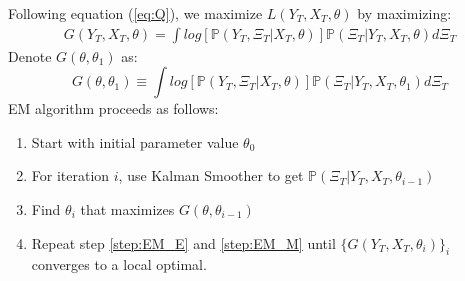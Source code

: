 \documentclass[12pt]{article}
\newenvironment{boenumerate}
    {\begin{enumerate}\renewcommand\labelenumi{\textbf\theenumi}}
    {\end{enumerate}}
\numberwithin{equation}{section}
\begin{document}
Following equation (\ref{eq:Q}), we maximize $L(Y_T,X_T,\theta)$ by maximizing: 
\begin{align}
    G(Y_T,X_T,\theta) = \int log[\mathbb{P}(Y_T,\Xi_T|X_T,\theta)]\mathbb{P}(\Xi_T|Y_T,X_T,\theta)d\Xi_T \label{eq:G}
\end{align}
Denote $G(\theta,\theta_1)$ as: 
\[
    G(\theta,\theta_1) \equiv \int log[\mathbb{P}(Y_T,\Xi_T|X_T,\theta)]\mathbb{P}(\Xi_T|Y_T,X_T,\theta_1)d\Xi_T
\]
EM algorithm proceeds as follows:
\begin{boenumerate}
    \item Start with initial parameter value $\theta_0$
    \item \label{step:EM_E} For iteration $i$, use Kalman Smoother to get $\mathbb{P}(\Xi_T|Y_T,X_T,\theta_{i-1})$
    \item \label{step:EM_M} Find $\theta_{i}$ that maximizes $G(\theta,\theta_{i-1})$    
    \item Repeat step \ref{step:EM_E} and \ref{step:EM_M} until $\{G(Y_T,X_T,\theta_i)\}_i$ converges to a local optimal.
\end{boenumerate}
\end{document}
